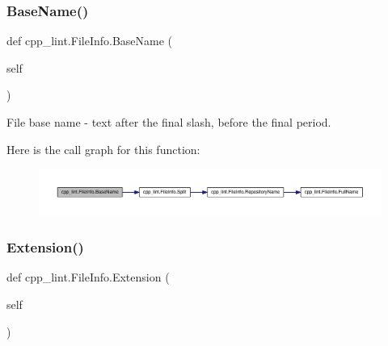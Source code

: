 \subsubsection{\texorpdfstring{Base\+Name()}{BaseName()}}
{\footnotesize\ttfamily def cpp\+\_\+lint.\+File\+Info.\+Base\+Name (\begin{DoxyParamCaption}\item[{}]{self }\end{DoxyParamCaption})}

\begin{DoxyVerb}File base name - text after the final slash, before the final period.\end{DoxyVerb}
 Here is the call graph for this function\+:
\nopagebreak
\begin{figure}[H]
\begin{center}
\leavevmode
\includegraphics[width=350pt]{classcpp__lint_1_1_file_info_ab5d91e42e21b9fdc9b2e4bb5e30d40b3_cgraph}
\end{center}
\end{figure}
\mbox{\label{classcpp__lint_1_1_file_info_ac968b5d06e9638f7412977aa772261d1}} 
\subsubsection{\texorpdfstring{Extension()}{Extension()}}
{\footnotesize\ttfamily def cpp\+\_\+lint.\+File\+Info.\+Extension (\begin{DoxyParamCaption}\item[{}]{self }\end{DoxyParamCaption})}


